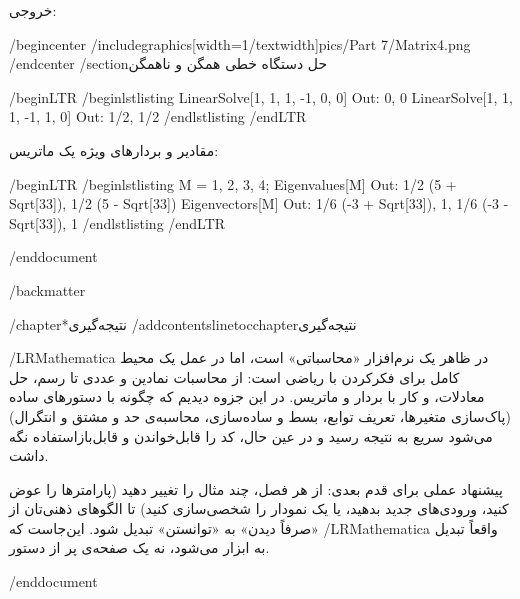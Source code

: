 خروجی:

/begin{center}
/includegraphics[width=1/textwidth]{pics/Part 7/Matrix4.png}
/end{center}
/section{حل دستگاه خطی همگن و ناهمگن}

/begin{LTR}
/begin{lstlisting}
LinearSolve[{{1, 1}, {1, -1}}, {0, 0}]          Out: {0, 0}
LinearSolve[{{1, 1}, {1, -1}}, {1, 0}]          Out: {1/2, 1/2}
/end{lstlisting}
/end{LTR}

مقادیر و بردار‌های ویژه یک ماتریس:

/begin{LTR}
/begin{lstlisting}
M = {{1, 2}, {3, 4}};
Eigenvalues[M]         Out: {1/2 (5 + Sqrt[33]), 1/2 (5 - Sqrt[33])}
Eigenvectors[M]          Out: {{1/6 (-3 + Sqrt[33]), 1}, {1/6 (-3 - Sqrt[33]), 1}}
/end{lstlisting}
/end{LTR}

/end{document}

/backmatter

/chapter*{نتیجه‌گیری}
/addcontentsline{toc}{chapter}{نتیجه‌گیری}

/LR{Mathematica} در ظاهر یک نرم‌افزار «محاسباتی» است، اما در عمل یک محیط کامل برای فکرکردن با ریاضی است: از محاسبات نمادین و عددی تا رسم، حل معادلات، و کار با بردار و ماتریس. 
در این جزوه دیدیم که چگونه با دستورهای ساده (پاک‌سازی متغیرها، تعریف توابع، بسط و ساده‌سازی، محاسبه‌ی حد و مشتق و انتگرال) می‌شود سریع به نتیجه رسید و در عین حال، کد را قابل‌خواندن و قابل‌بازاستفاده نگه داشت.

پیشنهاد عملی برای قدم بعدی: از هر فصل، چند مثال را تغییر دهید (پارامترها را عوض کنید، ورودی‌های جدید بدهید، یا یک نمودار را شخصی‌سازی کنید) تا الگوهای ذهنی‌تان از «صرفاً دیدن» به «توانستن» تبدیل شود. 
این‌جاست که /LR{Mathematica} واقعاً تبدیل به ابزار می‌شود، نه یک صفحه‌ی پر از دستور.

/end{document}
